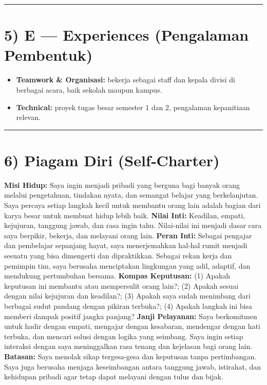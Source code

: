 \documentclass[
  letterpaper,
  DIV=11,
  numbers=noendperiod]{scrreprt}
\providecommand{\tightlist}{%
  \setlength{\itemsep}{0pt}\setlength{\parskip}{0pt}}\usepackage{longtable,booktabs,array}
\begin{document}
\begin{center}\rule{0.5\linewidth}{0.5pt}\end{center}

\section{5) E --- Experiences (Pengalaman
Pembentuk)}\label{e-experiences-pengalaman-pembentuk}

\begin{itemize}
\tightlist
\item
  \textbf{Teamwork \& Organisasi:} bekerja sebagai staff dan kepala
  divisi di berbagai acara, baik sekolah maupun kampus.
\item
  \textbf{Technical:} proyek tugas besar semester 1 dan 2, pengalaman
  kepanitiaan relevan.
\end{itemize}

\begin{center}\rule{0.5\linewidth}{0.5pt}\end{center}

\section{6) Piagam Diri (Self‑Charter)}\label{piagam-diri-selfcharter}

\textbf{Misi Hidup:} Saya ingin menjadi pribadi yang berguna bagi banyak
orang melalui pengetahuan, tindakan nyata, dan semangat belajar yang
berkelanjutan. Saya percaya setiap langkah kecil untuk membantu orang
lain adalah bagian dari karya besar untuk membuat hidup lebih baik.
\textbf{Nilai Inti:} Keadilan, empati, kejujuran, tanggung jawab, dan
rasa ingin tahu. Nilai-nilai ini menjadi dasar cara saya berpikir,
bekerja, dan melayani orang lain. \textbf{Peran Inti:} Sebagai pengajar
dan pembelajar sepanjang hayat, saya menerjemahkan hal-hal rumit menjadi
sesuatu yang bisa dimengerti dan dipraktikkan. Sebagai rekan kerja dan
pemimpin tim, saya berusaha menciptakan lingkungan yang adil, adaptif,
dan mendukung pertumbuhan bersama. \textbf{Kompas Keputusan:} (1) Apakah
keputusan ini membantu atau mempersulit orang lain?; (2) Apakah sesuai
dengan nilai kejujuran dan keadilan?; (3) Apakah saya sudah menimbang
dari berbagai sudut pandang dengan pikiran terbuka?; (4) Apakah langkah
ini bisa memberi dampak positif jangka panjang? \textbf{Janji
Pelayanan:} Saya berkomitmen untuk hadir dengan empati, mengajar dengan
kesabaran, mendengar dengan hati terbuka, dan mencari solusi dengan
logika yang seimbang. Saya ingin setiap interaksi dengan saya
meninggalkan rasa tenang dan kejelasan bagi orang lain.
\textbf{Batasan:} Saya menolak sikap tergesa-gesa dan keputusan tanpa
pertimbangan. Saya juga berusaha menjaga keseimbangan antara tanggung
jawab, istirahat, dan kehidupan pribadi agar tetap dapat melayani dengan
tulus dan bijak.
\end{document}
